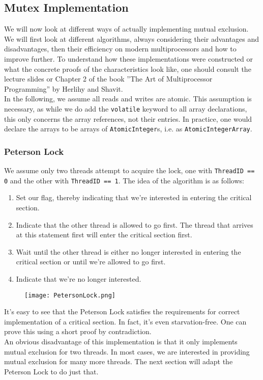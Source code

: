 \documentclass[main]{subfiles}
\begin{document}

\subsection{Mutex Implementation}
We will now look at different ways of actually implementing mutual exclusion. We will first look at different algorithms, always considering their advantages and disadvantages, then their efficiency on modern multiprocessors and how to improve further. To understand how these implementations were constructed or what the concrete proofs of the characteristics look like, one should consult the lecture slides or Chapter 2 of the book ''The Art of Multiprocessor Programming'' by Herlihy and Shavit.\\[3mm]
In the following, we assume all reads and writes are atomic. This assumption is necessary, as while we do add the \texttt{volatile} keyword to all array declarations, this only concerns the array references, not their entries. In practice, one would declare the arrays to be arrays of \texttt{AtomicInteger}s, i.e. as \texttt{AtomicIntegerArray}.

\subsubsection{Peterson Lock} \label{Peterson's Lock}
We assume only two threads attempt to acquire the lock, one with \texttt{ThreadID == 0} and the other with \texttt{ThreadID == 1}. The idea of the algorithm is as follows:
\begin{enumerate}
    \item Set our flag, thereby indicating that we're interested in entering the critical section.
    \item Indicate that the other thread is allowed to go first. The thread that arrives at this statement first will enter the critical section first.
    \item Wait until the other thread is either no longer interested in entering the critical section or until we're allowed to go first.
    \item Indicate that we're no longer interested.
\end{enumerate}
\begin{figure}[H]
    \centering
    \texttt{[image: PetersonLock.png]}
\end{figure}
It's easy to see that the Peterson Lock satisfies the requirements for correct implementation of a critical section. In fact, it's even starvation-free. One can prove this using a short proof by contradiction.\\[3mm]
An obvious disadvantage of this implementation is that it only implements mutual exclusion for two threads. In most cases, we are interested in providing mutual exclusion for many more threads. The next section will adapt the Peterson Lock to do just that.
\end{document}
